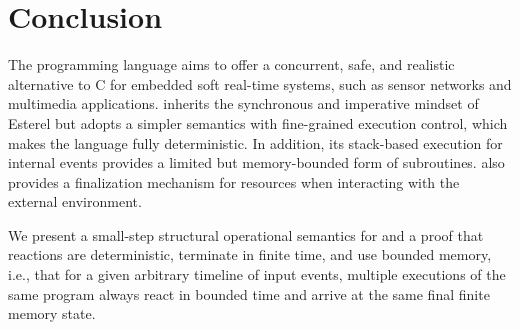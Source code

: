 \section{Conclusion}
\label{sec.conclusion}

The programming language \CEU aims to offer a concurrent, safe, and realistic
alternative to C for embedded soft real-time systems, such as sensor networks
and multimedia applications.
%
%
\CEU inherits the synchronous and imperative mindset of Esterel but adopts a
simpler semantics with fine-grained execution control, which makes the
language fully deterministic.
%
In addition, its stack-based execution for internal events provides a limited
but memory-bounded form of subroutines.
%
\CEU also provides a finalization mechanism for resources when interacting with
the external environment.

We present a small-step structural operational semantics for
\CEU and a proof that reactions are deterministic, terminate in finite time,
and use bounded memory, i.e., that for a given arbitrary timeline of input
events, multiple executions of the same program always react in bounded time
and arrive at the same final finite memory state.
